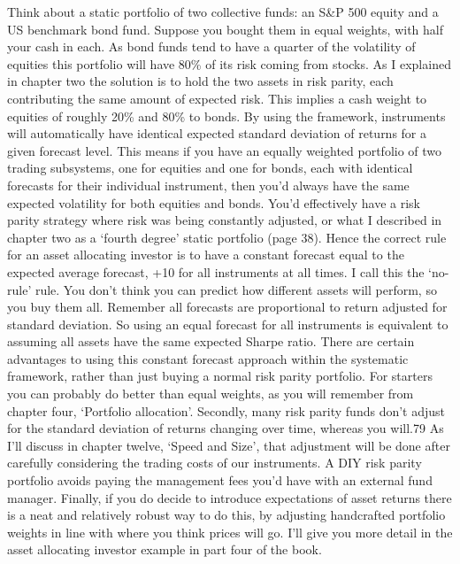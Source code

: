 

\begin{englishblock} Think about a static portfolio of two collective funds: an S\&P 500 equity and a US benchmark bond fund. Suppose you bought them in equal weights, with half your cash in each. As bond funds tend to have a quarter of the volatility of equities this portfolio will have 80\% of its risk coming from stocks. As I explained in chapter two the solution is to hold the two assets in risk parity, each contributing the same amount of expected risk. This implies a cash weight to equities of roughly 20\% and 80\% to bonds. By using the framework, instruments will automatically have identical expected standard deviation of returns for a given forecast level. This means if you have an equally weighted portfolio of two trading subsystems, one for equities and one for bonds, each with identical forecasts for their individual instrument, then you'd always have the same expected volatility for both equities and bonds. You'd effectively have a risk parity strategy where risk was being constantly adjusted, or what I described in chapter two as a ‘fourth degree' static portfolio (page 38). Hence the correct rule for an asset allocating investor is to have a constant forecast equal to the expected average forecast, +10 for all instruments at all times. I call this the ‘no-rule' rule. You don't think you can predict how different assets will perform, so you buy them all. Remember all forecasts are proportional to return adjusted for standard deviation. So using an equal forecast for all instruments is equivalent to assuming all assets have the same expected Sharpe ratio. There are certain advantages to using this constant forecast approach within the systematic framework, rather than just buying a normal risk parity portfolio. For starters you can probably do better than equal weights, as you will remember from chapter four, ‘Portfolio allocation'. Secondly, many risk parity funds don't adjust for the standard deviation of returns changing over time, whereas you will.79 As I'll discuss in chapter twelve, ‘Speed and Size', that adjustment will be done after carefully considering the trading costs of our instruments. A DIY risk parity portfolio avoids paying the management fees you'd have with an external fund manager. Finally, if you do decide to introduce expectations of asset returns there is a neat and relatively robust way to do this, by adjusting handcrafted portfolio weights in line with where you think prices will go. I'll give you more detail in the asset allocating investor example in part four of the book. \end{englishblock}

